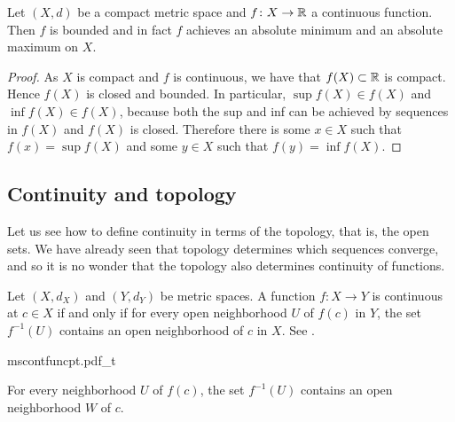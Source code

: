 \begin{thm}
Let $(X,d)$ be a compact metric space
and $f \colon X \to {\mathbb{R}}$ a continuous function.  Then
$f$ is bounded and in fact
$f$ achieves an absolute minimum and an absolute maximum on $X$.
\end{thm}

\begin{proof}
As $X$ is compact and $f$ is continuous, we have
that $f(X) \subset {\mathbb{R}}$ is compact.  Hence $f(X)$ is closed
and bounded.  In particular,
$\sup f(X) \in f(X)$ and
$\inf f(X) \in f(X)$, because both the sup and inf
can be achieved by sequences in $f(X)$ and $f(X)$ is closed.
Therefore there is some $x \in X$ such that $f(x) = \sup f(X)$
and some $y \in X$ such that $f(y) = \inf f(X)$.
\end{proof}

\subsection{Continuity and topology}

Let us see how to define continuity in terms of the topology, that is,
the open sets.  We have already seen that topology determines which 
sequences converge, and so it is no wonder that the topology also
determines continuity of functions.

\begin{lemma} \label{lemma:mstopocontloc}
Let $(X,d_X)$ and $(Y,d_Y)$ be metric spaces.
A function $f \colon X \to Y$ is continuous at $c \in X$
if and only if for every open neighborhood $U$ of $f(c)$ in $Y$, the set
$f^{-1}(U)$ contains an open neighborhood of $c$ in $X$.
See .
\end{lemma}

\begin{myfigureht}
{mscontfuncpt.pdf_t}
\caption{For every neighborhood $U$ of $f(c)$, the set $f^{-1}(U)$ contains an open
neighborhood $W$ of $c$.\label{fig:mscontfuncpt}}
\end{myfigureht}

